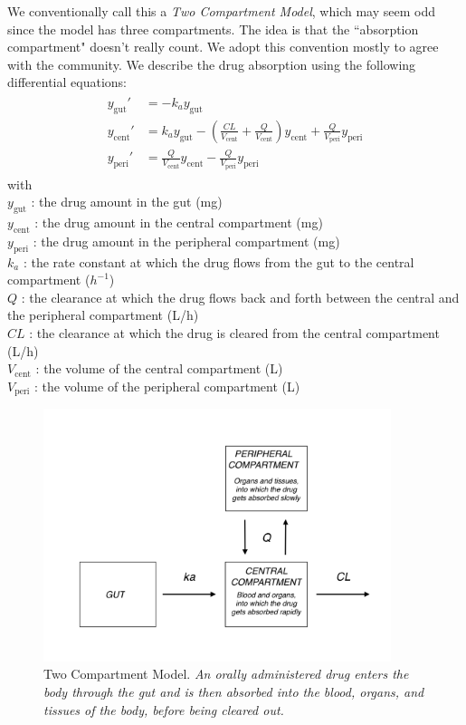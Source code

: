 \documentclass[11pt]{article}
\begin{document}
We conventionally call this a \textit{Two Compartment Model}, which may seem odd since
 the model has three compartments. The idea is that the ``absorption compartment" doesn't
 really count. We adopt this convention mostly to agree with the community.
%
We describe the drug absorption using the following differential equations:
%
\begin{eqnarray}
  \begin{aligned}
  y_\mathrm{gut}' &= -k_a y_\mathrm{gut} \\
  y_\mathrm{cent}' &= k_a y_\mathrm{gut} - \left(\frac{CL}{V_\mathrm{cent}} + \frac{Q}{V_\mathrm{cent}} \right) y_\mathrm{cent} +  \frac{Q}{V_\mathrm{peri}} y_\mathrm{peri} \\
  y_\mathrm{peri}' &= \frac{Q}{V_\mathrm{cent}} y_\mathrm{cent} - \frac{Q}{V_\mathrm{peri}} y_\mathrm{peri}
  \end{aligned}
  \label{eq:2Cpt}
\end{eqnarray}
%
with \\
$y_\mathrm{gut}$ : the drug amount in the gut (mg)  \\
$y_\mathrm{cent}$ : the drug amount in the central compartment (mg)  \\
$y_\mathrm{peri}$ : the drug amount in the peripheral compartment (mg)  \\
$k_a$ : the rate constant at which the drug flows from the gut to the central compartment ($h^{-1}$)  \\
$Q$ : the clearance at which the drug flows back and forth between the central and the peripheral compartment (L/h) \\ 
$CL$ : the clearance at which the drug is cleared from the central compartment (L/h)  \\
$V_\mathrm{cent}$ : the volume of the central compartment (L)  \\
$V_\mathrm{peri}$ : the volume of the peripheral compartment (L) \\

\begin{figure}[!htb]
\begin{center}
\includegraphics[width=4in,trim=0in 0in 0 0in]{graphics/TwoCptNice.png}
\caption{{Two Compartment Model. \textit{An orally administered drug enters the body through
the gut and is then absorbed into the blood, organs, and tissues of the body, before being cleared out.}}}
\label{TwoCptNice}
\end{center}
\end{figure}
\end{document}
